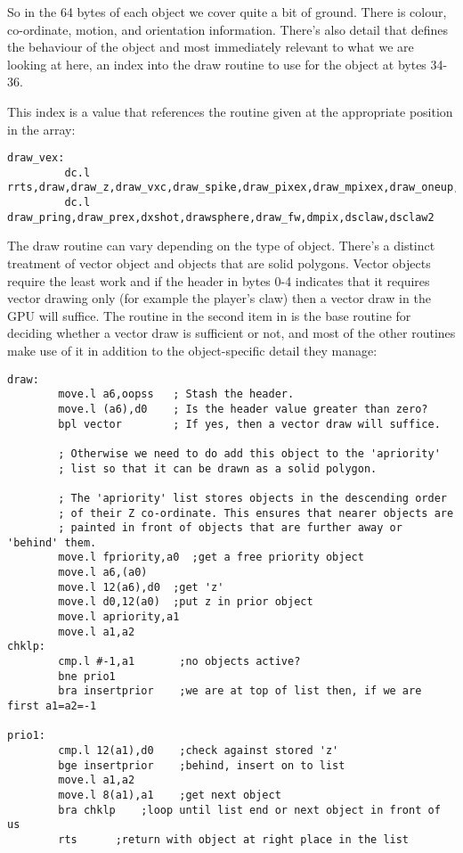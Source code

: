 So in the 64 bytes of each object we cover quite a bit of ground. There is colour, co-ordinate, motion, and orientation
information. There's also detail that defines the behaviour of the object and most immediately relevant to what
we are looking at here, an index into the draw routine to use for the object at bytes 34-36.

This index is a value that references the routine given at the appropriate position in the  array:
\begin{lstlisting}
draw_vex: 
         dc.l rrts,draw,draw_z,draw_vxc,draw_spike,draw_pixex,draw_mpixex,draw_oneup,draw_pel,changex
         dc.l draw_pring,draw_prex,dxshot,drawsphere,draw_fw,dmpix,dsclaw,dsclaw2
\end{lstlisting}

The draw routine can vary depending on the type of object. There's a distinct treatment of vector object and objects
that are solid polygons. Vector objects require the least work and if the header in bytes 0-4 indicates that it requires
vector drawing only (for example the player's claw) then a vector draw in the GPU will suffice. The  routine
in the second item in  is the base routine for deciding whether a vector draw is sufficient or not, and
most of the other routines make use of it in addition to the object-specific detail they manage:

\begin{lstlisting}
draw:
        move.l a6,oopss   ; Stash the header.
        move.l (a6),d0    ; Is the header value greater than zero?
        bpl vector        ; If yes, then a vector draw will suffice.

        ; Otherwise we need to do add this object to the 'apriority'
        ; list so that it can be drawn as a solid polygon.

        ; The 'apriority' list stores objects in the descending order
        ; of their Z co-ordinate. This ensures that nearer objects are
        ; painted in front of objects that are further away or 'behind' them.
        move.l fpriority,a0  ;get a free priority object
        move.l a6,(a0)
        move.l 12(a6),d0  ;get 'z'
        move.l d0,12(a0)  ;put z in prior object
        move.l apriority,a1
        move.l a1,a2
chklp:
        cmp.l #-1,a1       ;no objects active?
        bne prio1
        bra insertprior    ;we are at top of list then, if we are first a1=a2=-1

prio1:
        cmp.l 12(a1),d0    ;check against stored 'z'
        bge insertprior    ;behind, insert on to list
        move.l a1,a2
        move.l 8(a1),a1    ;get next object
        bra chklp    ;loop until list end or next object in front of us
        rts      ;return with object at right place in the list
\end{lstlisting}

